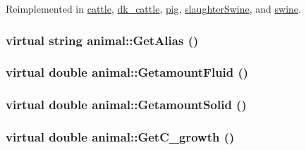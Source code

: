 Reimplemented in \hyperlink{classcattle_a418e7ccadab4a1b2b71d5687c4f22373}{cattle}, \hyperlink{classdk__cattle_a33ea8994d985d00a3c0910a44e7c5d15}{dk\_\-cattle}, \hyperlink{classpig_ace82dae0cc5b75ed3051b145e12d1803}{pig}, \hyperlink{classslaughter_swine_a878b44d9124ee9a550f86ecf353e1401}{slaughterSwine}, and \hyperlink{classswine_aa5b1551767e9bc33a2dad33ef32627fb}{swine}.\hypertarget{classanimal_a1fd13dcc0f1482d3f288d2265d1ed1ec}{
\subsubsection[{GetAlias}]{\setlength{\rightskip}{0pt plus 5cm}virtual string animal::GetAlias ()}}
\label{classanimal_a1fd13dcc0f1482d3f288d2265d1ed1ec}
\hypertarget{classanimal_a47dafe1783cc6864cf11b345efc5e622}{
\subsubsection[{GetamountFluid}]{\setlength{\rightskip}{0pt plus 5cm}virtual double animal::GetamountFluid ()}}
\label{classanimal_a47dafe1783cc6864cf11b345efc5e622}
\hypertarget{classanimal_a7d4699bba0c75390bb33bdf70254ad64}{
\subsubsection[{GetamountSolid}]{\setlength{\rightskip}{0pt plus 5cm}virtual double animal::GetamountSolid ()}}
\label{classanimal_a7d4699bba0c75390bb33bdf70254ad64}
\hypertarget{classanimal_a231533408e9e70e7278b7f3c352939a1}{
\subsubsection[{GetC\_\-growth}]{\setlength{\rightskip}{0pt plus 5cm}virtual double animal::GetC\_\-growth ()}}
